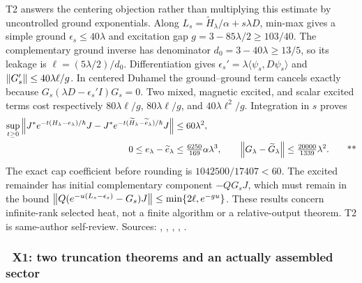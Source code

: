 T2 answers the centering objection rather than multiplying this estimate by
uncontrolled ground exponentials.  Along
$L_s=\widetilde H_\lambda/\alpha+s\lambda D$,
min-max gives a simple ground $\epsilon_s\le40\lambda$ and excitation gap
$g=3-85\lambda/2\ge103/40$.  The complementary ground inverse has denominator
$d_0=3-40\lambda\ge13/5$, so its leakage is
$\ell=(5\lambda/2)/d_0$.  Differentiation gives
$\epsilon_s'=\lambda\langle\psi_s,D\psi_s\rangle$ and
$\left\lVert G_s'\right\rVert\le40\lambda\ell/g$.  In centered Duhamel the ground--ground term
cancels exactly because
$G_s(\lambda D-\epsilon_s'I)G_s=0$.  Two mixed, magnetic excited, and scalar
excited terms cost respectively $80\lambda\ell/g$, $80\lambda\ell/g$, and
$40\lambda\ell^2/g$.  Integration in $s$ proves
\begin{align}
 \sup_{t\ge0}\left\lVert J^*e^{-t(H_\lambda-e_\lambda)/\hbar}J
 -J^*e^{-t(\widetilde H_\lambda-\widetilde e_\lambda)/\hbar}J\right\rVert
 &\le60\lambda^2,\notag\\
 0\le e_\lambda-\widetilde e_\lambda
 &\le\tfrac{6250}{169}\alpha\lambda^3,\qquad
 \left\lVert G_\lambda-\widetilde G_\lambda\right\rVert
 \le\tfrac{20000}{1339}\lambda^2.\qquad\text{**}
 \label{recent:t-centered}
\end{align}
The exact cap coefficient before rounding is $1042500/17407<60$.
The excited remainder has initial complementary component $-QG_sJ$, which must
remain in the bound $\left\lVert Q(e^{-u(L_s-\epsilon_s)}-G_s)J\right\rVert
\le\min\{2\ell,e^{-gu}\}$.  These results concern infinite-rank selected heat,
not a finite algorithm or a relative-output theorem.  T2 is same-author
self-review.  Sources: ,
,
,
,
.

\subsubsection{\workstar\ X1: two truncation theorems and an actually assembled sector}


